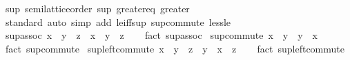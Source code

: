 \begin{isabellebody}
\isamarkupfalse%
%
\endisatagproof
{\isafoldproof}%
%
\isadelimproof
\isanewline
%
\endisadelimproof
\isanewline
{}\isamarkupfalse%
\ sup{\isacharcolon}{\kern0pt}\ semilattice{\isacharunderscore}{\kern0pt}order\ sup\ greater{\isacharunderscore}{\kern0pt}eq\ greater\isanewline
%
\isadelimproof
\ \ %
\endisadelimproof
%
\isatagproof
{}\isamarkupfalse%
\ standard\ {\isacharparenleft}{\kern0pt}auto\ simp\ add{\isacharcolon}{\kern0pt}\ le{\isacharunderscore}{\kern0pt}iff{\isacharunderscore}{\kern0pt}sup\ sup{\isachardot}{\kern0pt}commute\ less{\isacharunderscore}{\kern0pt}le{\isacharparenright}{\kern0pt}%
\endisatagproof
{\isafoldproof}%
%
\isadelimproof
\isanewline
%
\endisadelimproof
\isanewline
{}\isamarkupfalse%
\ sup{\isacharunderscore}{\kern0pt}assoc{\isacharcolon}{\kern0pt}\ {\isachardoublequoteopen}{\isacharparenleft}{\kern0pt}x\ {\isasymsqunion}\ y{\isacharparenright}{\kern0pt}\ {\isasymsqunion}\ z\ {\isacharequal}{\kern0pt}\ x\ {\isasymsqunion}\ {\isacharparenleft}{\kern0pt}y\ {\isasymsqunion}\ z{\isacharparenright}{\kern0pt}{\isachardoublequoteclose}\isanewline
%
\isadelimproof
\ \ %
\endisadelimproof
%
\isatagproof
{}\isamarkupfalse%
\ {\isacharparenleft}{\kern0pt}fact\ sup{\isachardot}{\kern0pt}assoc{\isacharparenright}{\kern0pt}%
\endisatagproof
{\isafoldproof}%
%
\isadelimproof
\isanewline
%
\endisadelimproof
\isanewline
{}\isamarkupfalse%
\ sup{\isacharunderscore}{\kern0pt}commute{\isacharcolon}{\kern0pt}\ {\isachardoublequoteopen}{\isacharparenleft}{\kern0pt}x\ {\isasymsqunion}\ y{\isacharparenright}{\kern0pt}\ {\isacharequal}{\kern0pt}\ {\isacharparenleft}{\kern0pt}y\ {\isasymsqunion}\ x{\isacharparenright}{\kern0pt}{\isachardoublequoteclose}\isanewline
%
\isadelimproof
\ \ %
\endisadelimproof
%
\isatagproof
{}\isamarkupfalse%
\ {\isacharparenleft}{\kern0pt}fact\ sup{\isachardot}{\kern0pt}commute{\isacharparenright}{\kern0pt}%
\endisatagproof
{\isafoldproof}%
%
\isadelimproof
\isanewline
%
\endisadelimproof
\isanewline
{}\isamarkupfalse%
\ sup{\isacharunderscore}{\kern0pt}left{\isacharunderscore}{\kern0pt}commute{\isacharcolon}{\kern0pt}\ {\isachardoublequoteopen}x\ {\isasymsqunion}\ {\isacharparenleft}{\kern0pt}y\ {\isasymsqunion}\ z{\isacharparenright}{\kern0pt}\ {\isacharequal}{\kern0pt}\ y\ {\isasymsqunion}\ {\isacharparenleft}{\kern0pt}x\ {\isasymsqunion}\ z{\isacharparenright}{\kern0pt}{\isachardoublequoteclose}\isanewline
%
\isadelimproof
\ \ %
\endisadelimproof
%
\isatagproof
{}\isamarkupfalse%
\ {\isacharparenleft}{\kern0pt}fact\ sup{\isachardot}{\kern0pt}left{\isacharunderscore}{\kern0pt}commute{\isacharparenright}{\kern0pt}%

\end{isabellebody}
